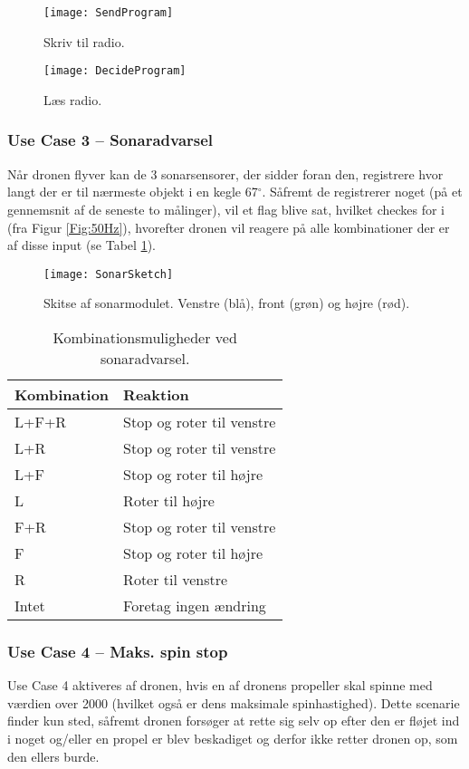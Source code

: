 \documentclass[Main]{subfiles}
\begin{document}
\begin{figure}[H]
\centering
\texttt{[image: SendProgram]}
\caption{Skriv til radio.}
\label{Fig:SendProgram}
\end{figure}


\begin{figure}[H]
\centering
\texttt{[image: DecideProgram]}
\caption{Læs radio.}
\label{Fig:DecideProgram}
\end{figure}


\newpage
\subsubsection{Use Case 3 -- Sonaradvarsel}
Når dronen flyver kan de 3 sonarsensorer, der sidder foran den, registrere hvor langt der er til nærmeste objekt i en kegle 67$^{\circ}$.
Såfremt de registrerer noget (på et gennemsnit af de seneste to målinger), vil et flag blive sat, hvilket checkes for i  (fra Figur \ref{Fig:50Hz}), hvorefter dronen vil reagere på alle kombinationer der er af disse input (se Tabel \ref{Tab:SonarAdvarsel}).


\begin{figure}[H]
\centering
\texttt{[image: SonarSketch]}
\caption{Skitse af sonarmodulet. Venstre (blå), front (grøn) og højre (rød).}
\label{Fig:SonarSketch}
\end{figure}

\begin{table}[H]
\centering
	\begin{tabular}{l l}
	\hline Kombination & Reaktion
	\\ \hline 
	L+F+R & Stop og roter til venstre \\
	L+R & Stop og roter til venstre\\
	L+F & Stop og roter til højre\\
	L & Roter til højre\\
	F+R & Stop og roter til venstre\\
	F & Stop og roter til højre\\
	R & Roter til venstre\\
	Intet & Foretag ingen ændring \\ \hline
	\end{tabular}
\caption{Kombinationsmuligheder ved sonaradvarsel.}
\label{Tab:SonarAdvarsel}
\end{table}

\subsubsection{Use Case 4 -- Maks. spin stop}
Use Case 4 aktiveres af dronen, hvis en af dronens propeller skal spinne med værdien over 2000 (hvilket også er dens maksimale spinhastighed).
Dette scenarie finder kun sted, såfremt dronen forsøger at rette sig selv op efter den er fløjet ind i noget og/eller en propel er blev beskadiget og derfor ikke retter dronen op, som den ellers burde.
\end{document}
